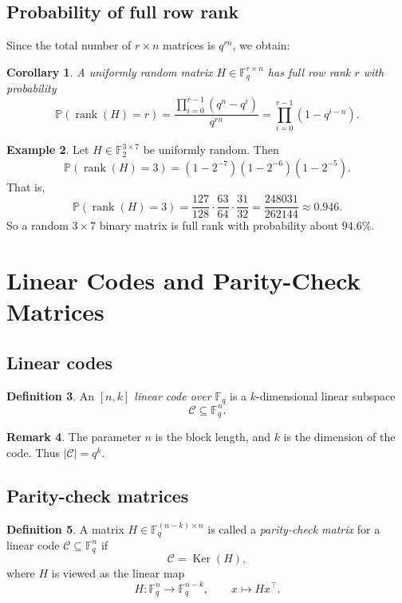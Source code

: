 \documentclass[11pt]{article}
\newcommand{\F}{\mathbb{F}}
\newcommand{\rank}{\operatorname{rank}}
\newcommand{\Ker}{\operatorname{Ker}}
\newcommand{\Prob}{\mathbb{P}}
\newcommand{\cC}{\mathcal{C}}
\theoremstyle{definition}
\newtheorem{definition}{Definition}[section]
\newtheorem{example}[definition]{Example}
\newtheorem{remark}[definition]{Remark}
\theoremstyle{plain}
\newtheorem{corollary}[definition]{Corollary}
\begin{document}
	\subsection{Probability of full row rank}
	
	Since the total number of \(r\times n\) matrices is \(q^{rn}\), we obtain:
	
	\begin{corollary}
		A uniformly random matrix \(H\in \F_q^{r\times n}\) has full row rank \(r\) with probability
		\[
		\Prob(\rank(H)=r)=\frac{\prod_{i=0}^{r-1}(q^n-q^i)}{q^{rn}}
		=
		\prod_{i=0}^{r-1}(1-q^{i-n}).
		\]
	\end{corollary}
	
	\begin{example}
		Let \(H\in \F_2^{3\times 7}\) be uniformly random. Then
		\[
		\Prob(\rank(H)=3)
		=
		\left(1-2^{-7}\right)\left(1-2^{-6}\right)\left(1-2^{-5}\right).
		\]
		That is,
		\[
		\Prob(\rank(H)=3)=\frac{127}{128}\cdot\frac{63}{64}\cdot\frac{31}{32}
		=
		\frac{248031}{262144}\approx 0.946.
		\]
		So a random \(3\times 7\) binary matrix is full rank with probability about \(94.6\%\).
	\end{example}
	
	\section{Linear Codes and Parity-Check Matrices}
	
	\subsection{Linear codes}
	
	\begin{definition}
		An \emph{\([n,k]\) linear code over \(\F_q\)} is a \(k\)-dimensional linear subspace
		\[
		\cC \subseteq \F_q^n.
		\]
	\end{definition}
	
	\begin{remark}
		The parameter \(n\) is the block length, and \(k\) is the dimension of the code. Thus \(|\cC|=q^k\).
	\end{remark}
	
	\subsection{Parity-check matrices}
	
	\begin{definition}
		A matrix \(H\in \F_q^{(n-k)\times n}\) is called a \emph{parity-check matrix} for a linear code \(\cC\subseteq \F_q^n\) if
		\[
		\cC = \Ker(H),
		\]
		where \(H\) is viewed as the linear map
		\[
		H:\F_q^n \to \F_q^{n-k}, \qquad x\longmapsto Hx^\top.
		\]
	\end{definition}
	
\end{document}

